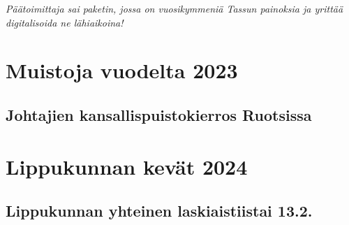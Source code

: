 \documentclass[10pt,finnish,a5paper,twoside=semi]{scrartcl}
\begin{document}
\textit{Päätoimittaja sai paketin, jossa on vuosikymmeniä Tassun painoksia ja
yrittää digitalisoida ne lähiaikoina!}



\clearpage\section{Muistoja vuodelta 2023}
        \subsection{Johtajien kansallispuistokierros Ruotsissa}


\clearpage\section{Lippukunnan kevät 2024}

	\subsection{Lippukunnan yhteinen laskiaistiistai 13.2.}
\end{document}
